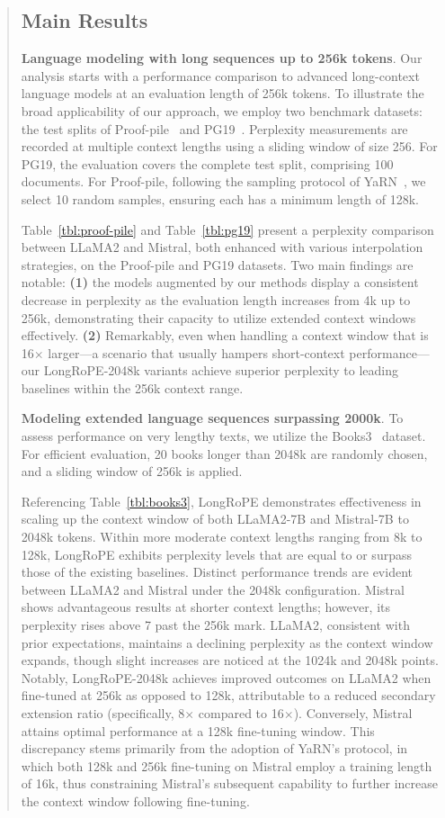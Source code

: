 \begin{abstract}
\subsection{Main Results}

\label{sec:mainresult}
\textbf{Language modeling with long sequences up to 256k tokens}. Our analysis starts with a performance comparison to advanced long-context language models at an evaluation length of 256k tokens. To illustrate the broad applicability of our approach, we employ two benchmark datasets: the test splits of Proof-pile~\cite{pg19} and PG19~\cite{pile}. Perplexity measurements are recorded at multiple context lengths using a sliding window of size 256. For PG19, the evaluation covers the complete test split, comprising 100 documents. For Proof-pile, following the sampling protocol of YaRN~\cite{yarn}, we select 10 random samples, ensuring each has a minimum length of 128k.

Table~\ref{tbl:proof-pile} and Table~\ref{tbl:pg19} present a perplexity comparison between LLaMA2 and Mistral, both enhanced with various interpolation strategies, on the Proof-pile and PG19 datasets. Two main findings are notable: \textbf{(1)} the models augmented by our methods display a consistent decrease in perplexity as the evaluation length increases from 4k up to 256k, demonstrating their capacity to utilize extended context windows effectively. \textbf{(2)} Remarkably, even when handling a context window that is 16$\times$ larger—a scenario that usually hampers short-context performance—our LongRoPE-2048k variants achieve superior perplexity to leading baselines within the 256k context range.

\textbf{Modeling extended language sequences surpassing 2000k}. To assess performance on very lengthy texts, we utilize the Books3~\cite{pile} dataset. For efficient evaluation, 20 books longer than 2048k are randomly chosen, and a sliding window of 256k is applied.

Referencing Table~\ref{tbl:books3}, LongRoPE demonstrates effectiveness in scaling up the context window of both LLaMA2-7B and Mistral-7B to 2048k tokens. Within more moderate context lengths ranging from 8k to 128k, LongRoPE exhibits perplexity levels that are equal to or surpass those of the existing baselines. Distinct performance trends are evident between LLaMA2 and Mistral under the 2048k configuration. Mistral shows advantageous results at shorter context lengths; however, its perplexity rises above 7 past the 256k mark. LLaMA2, consistent with prior expectations, maintains a declining perplexity as the context window expands, though slight increases are noticed at the 1024k and 2048k points. Notably, LongRoPE-2048k achieves improved outcomes on LLaMA2 when fine-tuned at 256k as opposed to 128k, attributable to a reduced secondary extension ratio (specifically, 8$\times$ compared to 16$\times$). Conversely, Mistral attains optimal performance at a 128k fine-tuning window. This discrepancy stems primarily from the adoption of YaRN's protocol, in which both 128k and 256k fine-tuning on Mistral employ a training length of 16k, thus constraining Mistral’s subsequent capability to further increase the context window following fine-tuning.


\end{abstract}
